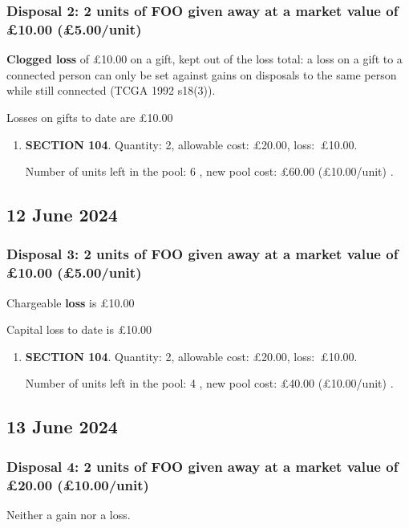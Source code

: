 \documentclass{article}
\begin{document}
\subsubsection*{
    Disposal 2: 2 units of FOO
given away at a market value of £10.00
    (£5.00/unit)%
}
\textbf{Clogged loss} of £10.00 on a gift, kept out of the loss total:
a loss on a gift to a connected person can only be set against gains on disposals to the same person while still connected (TCGA 1992 s18(3)).

Losses on gifts to date are £10.00

\begin{enumerate}
\item \textbf{SECTION 104}. Quantity: 2,
    allowable
    cost:
    £20.00,
    \mbox{loss: £10.00.}

    Number of units left in the pool:
    6%
,
    new pool cost: £60.00
    (£10.00/unit)%
.

\end{enumerate}



\subsection*{12 June 2024}
\subsubsection*{
    Disposal 3: 2 units of FOO
given away at a market value of £10.00
    (£5.00/unit)%
}
Chargeable \textbf{loss} is £10.00

Capital loss to date is £10.00

\begin{enumerate}
\item \textbf{SECTION 104}. Quantity: 2,
    allowable
    cost:
    £20.00,
    \mbox{loss: £10.00.}

    Number of units left in the pool:
    4%
,
    new pool cost: £40.00
    (£10.00/unit)%
.

\end{enumerate}



\subsection*{13 June 2024}
\subsubsection*{
    Disposal 4: 2 units of FOO
given away at a market value of £20.00
    (£10.00/unit)%
}
Neither a gain nor a loss.
\end{document}

